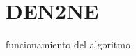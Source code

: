 \section{DEN2NE}
\label{sec:den2ne}

funcionamiento del algoritmo

\cite{den2ne}
\cite{gitden2ne}



